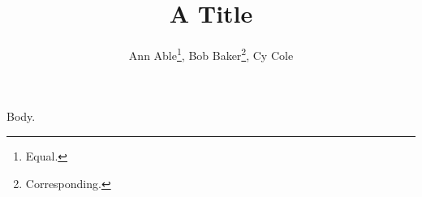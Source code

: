 \documentclass{article}
\title{A Title}
\author{Ann Able\thanks{Equal.}, Bob Baker\thanks{Corresponding.}\footnotemark[1], Cy Cole\footnotemark[2]}
\begin{document}
\maketitle
Body.
\end{document}
